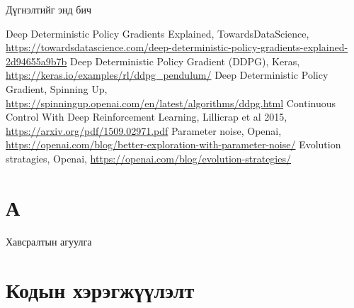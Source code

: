 \documentclass[12pt,A4]{report}
\begin{document}
Дүгнэлтийг энд бич


\singlespace
{}
\begin{thebibliography}{}
	Deep Deterministic Policy Gradients Explained, TowardsDataScience, \url{https://towardsdatascience.com/deep-deterministic-policy-gradients-explained-2d94655a9b7b}
	Deep Deterministic Policy Gradient (DDPG),  Keras, \url{https://keras.io/examples/rl/ddpg_pendulum/}
	Deep Deterministic Policy Gradient, Spinning Up, \url{https://spinningup.openai.com/en/latest/algorithms/ddpg.html}
	Continuous Control With Deep Reinforcement Learning, Lillicrap et al 2015, \url{https://arxiv.org/pdf/1509.02971.pdf}
	Parameter noise,  Openai, \url{https://openai.com/blog/better-exploration-with-parameter-noise/}
	Evolution stratagies,  Openai, \url{https://openai.com/blog/evolution-strategies/}
\end{thebibliography}


\appendix
{}

\chapter{А}
Хавсралтын агуулга

\chapter{Кодын хэрэгжүүлэлт}
\end{document}
